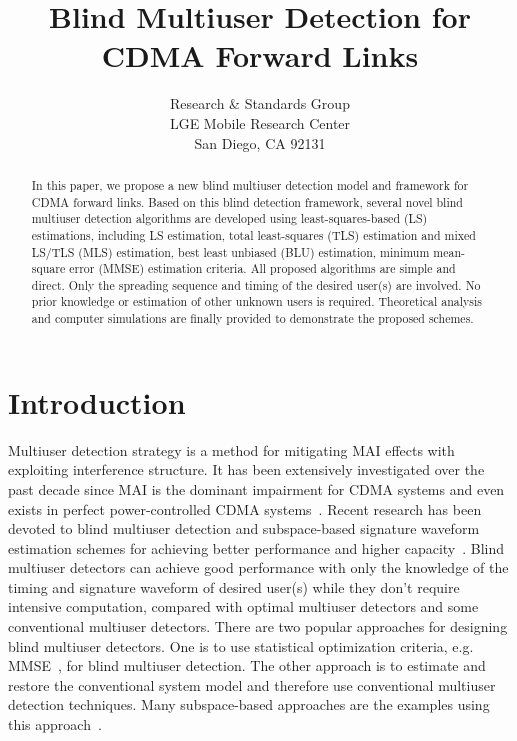 \documentclass[a4paper,10pt,fleqn, twocolumn]{IEEETran}
\title{Blind Multiuser Detection for CDMA Forward Links}
\author{Research \& Standards Group\\ LGE Mobile Research Center\\San Diego, CA 92131}
\date{}
\begin{document}
\maketitle

\begin{abstract}\small
In this paper, we propose a new blind multiuser detection model
and framework for CDMA forward links. Based on this blind
detection framework, several novel blind multiuser detection
algorithms are developed using least-squares-based (LS)
estimations, including LS estimation, total least-squares (TLS)
estimation and mixed LS/TLS (MLS) estimation, best least unbiased
(BLU) estimation, minimum mean-square error (MMSE) estimation
criteria. All proposed algorithms are simple and direct. Only the
spreading sequence and timing of the desired user(s) are involved.
No prior knowledge or estimation of other unknown users is
required. Theoretical analysis and computer simulations are
finally provided to demonstrate the proposed schemes.
\end{abstract}


\section{Introduction}

Multiuser detection strategy is a method for mitigating MAI
effects with exploiting interference structure. It has been
extensively investigated over the past decade since MAI is the
dominant impairment for CDMA systems and even exists in perfect
power-controlled CDMA systems~\cite{Verd98}. Recent research has
been devoted to blind multiuser detection and subspace-based
signature waveform estimation schemes for achieving better
performance and higher
capacity~\cite{Madh94,Honi95,Poor97,Wang98,Torl97,Liu96}. Blind
multiuser detectors can achieve good performance with only the
knowledge of the timing and signature waveform of desired user(s)
while they don't require intensive computation, compared with
optimal multiuser detectors and some conventional multiuser
detectors. There are two popular approaches for designing blind
multiuser detectors. One is to use statistical optimization
criteria, e.g. MMSE~\cite{Madh94,Honi95}, for blind multiuser
detection. The other approach is to estimate and restore the
conventional system model and therefore use conventional multiuser
detection techniques. Many subspace-based approaches are the
examples using this approach~\cite{Yang95,Wang98,Poor98,Wang99}.
\end{document}
